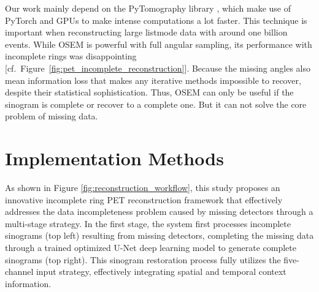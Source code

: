 \documentclass[12pt]{iopart}
\begin{document}
Our work mainly depend on the PyTomography library \cite{POLSON2025102020}, which make use of PyTorch and GPUs to make intense computations a lot faster. This technique is important when reconstructing large listmode data with around one billion events.
While OSEM is powerful with full angular sampling, its performance with incomplete rings was disappointing [cf.~Figure~\ref{fig:pet_incomplete_reconstruction}]. Because the missing angles also mean information loss that makes any iterative methods impossible to recover, despite their statistical sophistication. 
Thus, OSEM can only be useful if the sinogram is complete or recover to a complete one. But it can not solve the core problem of missing data.




\section{Implementation Methods}
\label{chap:methods}


As shown in Figure \ref{fig:reconstruction_workflow}, this study proposes an innovative incomplete ring PET reconstruction framework that effectively addresses the data incompleteness problem caused by missing detectors through a multi-stage strategy. In the first stage, the system first processes incomplete sinograms (top left) resulting from missing detectors, completing the missing data through a trained optimized U-Net deep learning model to generate complete sinograms (top right). This sinogram restoration process fully utilizes the five-channel input strategy, effectively integrating spatial and temporal context information.
\end{document}
